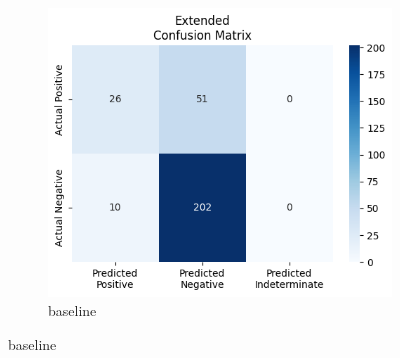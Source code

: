 \begin{figure}[H]
    \centering
    \begin{subfigure}[b]{0.5\textwidth}
        \centering
        \includegraphics[width=\linewidth]{figures/kdoqi_AVG.png}
        \caption{baseline}
        \label{fig:vascular-access}
    \end{subfigure}
    
    \vspace{1em} %


\end{figure}
